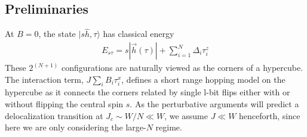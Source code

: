\documentclass[aps,pra,twocolumn,a4paper,showpacs,superscriptaddress,floatfix,10pt]{revtex4}
\begin{document}
\subsection{Preliminaries}
\label{sub:pt_preliminaries}

At $B=0$, the state $|s\hat{h}, \tau\rangle$ has classical energy
\begin{align}
	E_{s\tau} = s|\vec{h}(\tau)| + \sum_{i=1}^N \Delta_i \tau^z_i \label{Eq:ClassicalEnergy}
\end{align}
These $2^{(N+1)}$ configurations are naturally viewed as the corners of a hypercube.
The interaction term, $J \sum_i B_i \tau^x_i$, defines a short range hopping model on the hypercube as it connects the corners related by single l-bit flips either with or without flipping the central spin $s$.
As the perturbative arguments will predict a delocalization transition at $J_c \sim W/N \ll W$, we assume $J \ll W$ henceforth, since here we are only considering the large-$N$ regime.
\end{document}

